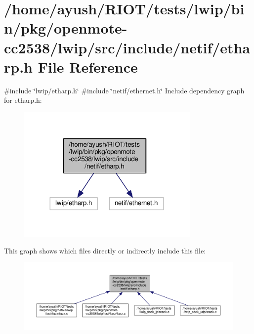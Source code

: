 \hypertarget{openmote-cc2538_2lwip_2src_2include_2netif_2etharp_8h}{}\section{/home/ayush/\+R\+I\+O\+T/tests/lwip/bin/pkg/openmote-\/cc2538/lwip/src/include/netif/etharp.h File Reference}
\label{openmote-cc2538_2lwip_2src_2include_2netif_2etharp_8h}
{\ttfamily \#include \char`\"{}lwip/etharp.\+h\char`\"{}}\newline
{\ttfamily \#include \char`\"{}netif/ethernet.\+h\char`\"{}}\newline
Include dependency graph for etharp.\+h\+:
\nopagebreak
\begin{figure}[H]
\begin{center}
\leavevmode
\includegraphics[width=252pt]{openmote-cc2538_2lwip_2src_2include_2netif_2etharp_8h__incl}
\end{center}
\end{figure}
This graph shows which files directly or indirectly include this file\+:
\nopagebreak
\begin{figure}[H]
\begin{center}
\leavevmode
\includegraphics[width=350pt]{openmote-cc2538_2lwip_2src_2include_2netif_2etharp_8h__dep__incl}
\end{center}
\end{figure}
